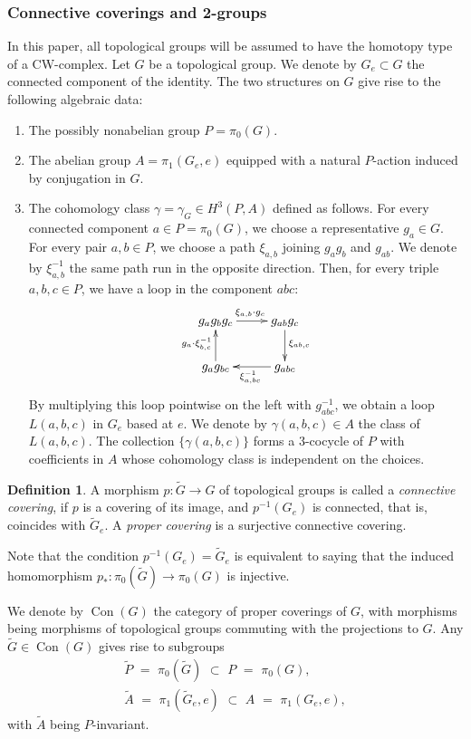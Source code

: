 \documentclass[english,11pt,leqno]{article}
\def\on{\operatorname}
\theoremstyle{definition}
\newtheorem{defi}[thm]{Definition}
\theoremstyle{remark}
\numberwithin{equation}{section}
\begin{document}
\subsubsection{Connective coverings and 2-groups}
In this paper, all topological groups will be assumed to have the homotopy type of a CW-complex. 
Let $G$ be a topological group. We denote by $G_e\subset G$ the connected component of the identity. 
The two structures on $G$ give rise to the following algebraic data:
\begin{enumerate}
\item[(1)] The possibly nonabelian group $P=\pi_0(G)$.

\item[(2)] The abelian group $A=\pi_1(G_e, e)$ equipped with a natural $P$-action induced by conjugation in $G$.

\item[(3)] The cohomology class $\gamma=\gamma_G\in H^3(P,A)$ defined as follows. For every connected
component $a\in P=\pi_0(G)$, we choose a representative $g_a\in G$. For every pair $a,b\in P$,
we choose a path $\xi_{a,b}$ joining $g_ag_b$ and $g_{ab}$. We denote by $\xi_{a,b}^{-1}$ the same path
run in the opposite direction. Then, for every triple $a,b,c\in P$, we have a loop
in the component $abc$:
\[
\xymatrix{
g_a g_b g_c \ar[r]^{\xi_{a,b}\cdot g_c}& g_{ab}g_c
\ar[d]^{\xi_{ab, c}}
\\
g_a g_{bc}\ar[u]^{g_a\cdot \xi_{b,c}^{-1}}&\ar[l]^{\xi_{a,bc}^{-1}} g_{abc}
}
\]
By multiplying this loop pointwise on the left with $g_{abc}^{-1}$, we obtain a loop $L(a,b,c)$ in
$G_e$ based at $e$. We denote by $\gamma(a,b,c) \in A$ the class of $L(a,b,c)$. 
The collection $\{ \gamma(a,b,c) \}$ forms a 3-cocycle of $P$ with coefficients in $A$ 
whose cohomology class is independent on the choices.
\end{enumerate}

\begin{defi}
A morphism $p:\widetilde G\to G$ of topological groups is called a {\em connective covering},
if $p$ is a covering of its image, and $p^{-1}(G_e)$ is connected, that is,
coincides with $\widetilde G_e$. A {\em proper covering} is a surjective connective covering. 
\end{defi}

Note that the condition $p^{-1}(G_e)=\widetilde G_e$ is equivalent to saying that the induced homomorphism
$p_*:\pi_0(\widetilde G)\to\pi_0(G)$ is injective. 

We denote by $\on{Con}(G)$ the category of proper coverings of $G$, with morphisms being morphisms
of topological groups commuting with the projections to $G$. Any $\widetilde G\in\on{Con}(G)$ gives rise to subgroups
\begin{equation}
	\label{eq:tilde-P-A}
	\begin{gathered}
		\widetilde P \,\,=\,\,\pi_0(\widetilde G)\,\, \subset\,\, P\,\,=\,\,\pi_0(G),
		\\
		\widetilde A \,\,=\,\, \pi_1(\widetilde G_e,e)\,\, \subset\,\, A\,\,=\,\,\pi_1(G_e,e),
	\end{gathered}
\end{equation}
with $\widetilde A$ being $P$-invariant. 
\end{document}
